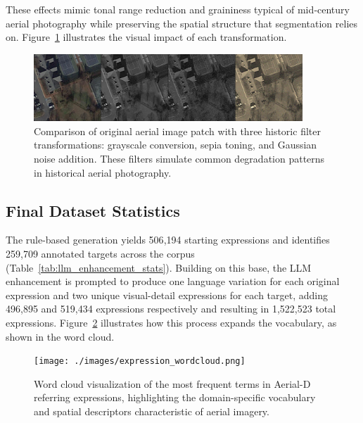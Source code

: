 These effects mimic tonal range reduction and graininess typical of mid‑century aerial photography while preserving the spatial structure that segmentation relies on. Figure~\ref{fig:historic_filters} illustrates the visual impact of each transformation.

\begin{figure}[t]
\centering
\includegraphics[width=0.9\textwidth]{./images/filters.png}
\caption{Comparison of original aerial image patch with three historic filter transformations: grayscale conversion, sepia toning, and Gaussian noise addition. These filters simulate common degradation patterns in historical aerial photography.}
\label{fig:historic_filters}
\end{figure}

\subsection{Final Dataset Statistics}

The rule-based generation yields 506{,}194 starting expressions and identifies 259{,}709 annotated targets across the corpus (Table~\ref{tab:llm_enhancement_stats}). Building on this base, the LLM enhancement is prompted to produce one language variation for each original expression and two unique visual-detail expressions for each target, adding 496{,}895 and 519{,}434 expressions respectively and resulting in 1{,}522{,}523 total expressions. Figure~\ref{fig:expression_wordcloud} illustrates how this process expands the vocabulary, as shown in the word cloud.


\begin{figure}[!t]
\centering
\texttt{[image: ./images/expression\_wordcloud.png]}
\caption{Word cloud visualization of the most frequent terms in Aerial-D referring expressions, highlighting the domain-specific vocabulary and spatial descriptors characteristic of aerial imagery.}
\label{fig:expression_wordcloud}
\end{figure}

